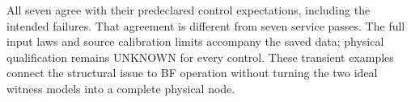 All seven agree with their predeclared control expectations, including the
intended failures. That agreement is different from seven service passes.
The full input laws and source calibration limits accompany the saved data;
physical qualification remains UNKNOWN for every control. These transient
examples connect the structural issue to BF operation without turning the
two ideal witness models into a complete physical node.
\FloatBarrier
